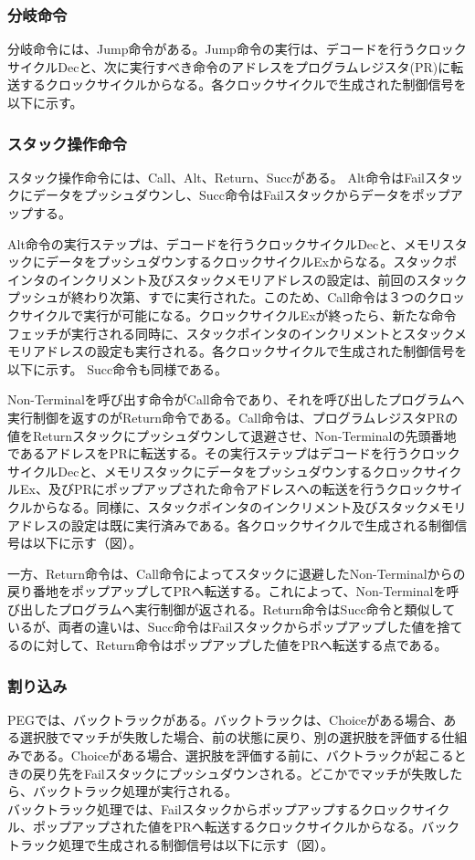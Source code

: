 \documentclass[paper]{ieicej}
\begin{document}
\subsubsection{分岐命令}
分岐命令には、Jump命令がある。Jump命令の実行は、デコードを行うクロックサイクルDecと、次に実行すべき命令のアドレスをプログラムレジスタ(PR)に転送するクロックサイクルからなる。各クロックサイクルで生成された制御信号を以下に示す。

\subsubsection{スタック操作命令}
スタック操作命令には、Call、Alt、Return、Succがある。
Alt命令はFailスタックにデータをプッシュダウンし、Succ命令はFailスタックからデータをポップアップする。

Alt命令の実行ステップは、デコードを行うクロックサイクルDecと、メモリスタックにデータをプッシュダウンするクロックサイクルExからなる。スタックポインタのインクリメント及びスタックメモリアドレスの設定は、前回のスタックプッシュが終わり次第、すでに実行された。このため、Call命令は３つのクロックサイクルで実行が可能になる。クロックサイクルExが終ったら、新たな命令フェッチが実行される同時に、スタックポインタのインクリメントとスタックメモリアドレスの設定も実行される。各クロックサイクルで生成された制御信号を以下に示す。
Succ命令も同様である。

Non-Terminalを呼び出す命令がCall命令であり、それを呼び出したプログラムへ実行制御を返すのがReturn命令である。Call命令は、プログラムレジスタPRの値をReturnスタックにプッシュダウンして退避させ、Non-Terminalの先頭番地であるアドレスをPRに転送する。その実行ステップはデコードを行うクロックサイクルDecと、メモリスタックにデータをプッシュダウンするクロックサイクルEx、及びPRにポップアップされた命令アドレスへの転送を行うクロックサイクルからなる。同様に、スタックポインタのインクリメント及びスタックメモリアドレスの設定は既に実行済みである。各クロックサイクルで生成される制御信号は以下に示す（図）。

一方、Return命令は、Call命令によってスタックに退避したNon-Terminalからの戻り番地をポップアップしてPRへ転送する。これによって、Non-Terminalを呼び出したプログラムへ実行制御が返される。Return命令はSucc命令と類似しているが、両者の違いは、Succ命令はFailスタックからポップアップした値を捨てるのに対して、Return命令はポップアップした値をPRへ転送する点である。

\subsubsection{割り込み}
PEGでは、バックトラックがある。バックトラックは、Choiceがある場合、ある選択肢でマッチが失敗した場合、前の状態に戻り、別の選択肢を評価する仕組みである。Choiceがある場合、選択肢を評価する前に、バクトラックが起こるときの戻り先をFailスタックにプッシュダウンされる。どこかでマッチが失敗したら、バックトラック処理が実行される。\\
バックトラック処理では、Failスタックからポップアップするクロックサイクル、ポップアップされた値をPRへ転送するクロックサイクルからなる。バックトラック処理で生成される制御信号は以下に示す（図）。
\end{document}

